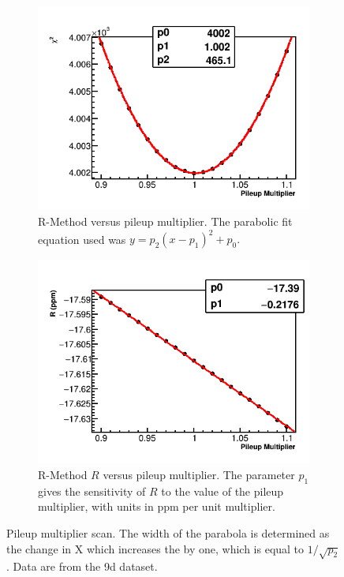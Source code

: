 \begin{figure}[h]
    \begin{subfigure}[t]{0.45\textwidth}
        \centering
        \includegraphics[width=\textwidth]{FullRatio_Chi2_Vs_PileupMultiplier_Canv}
        \caption{R-Method \chisq versus pileup multiplier. The parabolic fit equation used was $y = p_{2}(x - p_{1})^{2} + p_{0}.$}
    \end{subfigure}%
    \hspace{1cm}
    \begin{subfigure}[t]{0.45\textwidth}
        \centering
        \includegraphics[width=\textwidth]{FullRatio_R_Vs_PileupMultiplier_Canv}
        \caption{R-Method $R$ versus pileup multiplier. The parameter $p_{1}$ gives the sensitivity of $R$ to the value of the pileup multiplier, with units in ppm per unit multiplier.}
    \end{subfigure}
\caption[Pileup multiplier scan]{Pileup multiplier scan. The width of the parabola is determined as the change in X which increases the \chisq by one, which is equal to $1/\sqrt{p_{2}}$. Data are from the 9d dataset.}
\label{fig:PMscan}
\end{figure}



